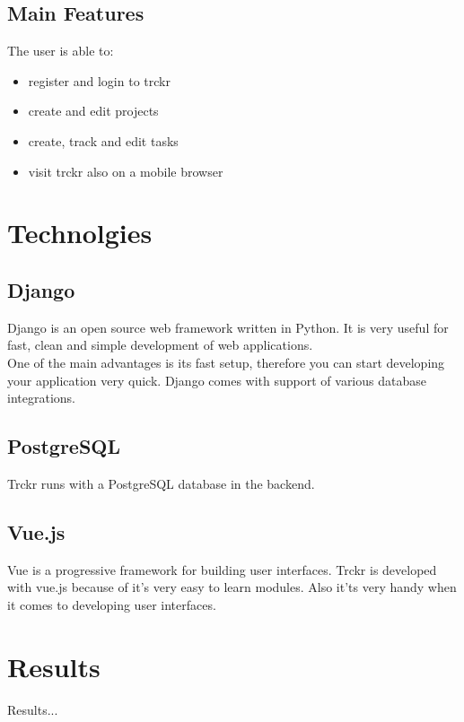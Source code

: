 \documentclass[a4paper, 12pt, headsepline]{scrartcl}
\begin{document}
\subsection{Main Features}
The user is able to:
\begin{itemize}
    \item register and login to trckr
    \item create and edit projects
    \item create, track and edit tasks
    \item visit trckr also on a mobile browser
\end{itemize}


\section{Technolgies}


\subsection{Django}
Django is an open source web framework written in Python. It is very useful for fast, clean and simple development of web applications.\\
One of the main advantages is its fast setup, therefore you can start developing your application very quick.
Django comes with support of various database integrations.

\subsection{PostgreSQL}
Trckr runs with a PostgreSQL database in the backend.

\subsection{Vue.js}
Vue is a progressive framework for building user interfaces. Trckr is developed with vue.js because of it's
very easy to learn modules. Also it'ts very handy when it comes to developing user interfaces.



\section{Results}
Results...
\end{document}
